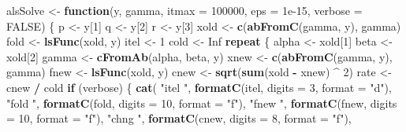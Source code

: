 \documentclass[
  12pt,
]{article}
\newenvironment{Shaded}{\begin{snugshade}}{\end{snugshade}}
\newcommand{\AttributeTok}[1]{\textcolor[rgb]{0.13,0.29,0.53}{#1}}
\newcommand{\ConstantTok}[1]{\textcolor[rgb]{0.56,0.35,0.01}{#1}}
\newcommand{\ControlFlowTok}[1]{\textcolor[rgb]{0.13,0.29,0.53}{\textbf{#1}}}
\newcommand{\DecValTok}[1]{\textcolor[rgb]{0.00,0.00,0.81}{#1}}
\newcommand{\FloatTok}[1]{\textcolor[rgb]{0.00,0.00,0.81}{#1}}
\newcommand{\FunctionTok}[1]{\textcolor[rgb]{0.13,0.29,0.53}{\textbf{#1}}}
\newcommand{\NormalTok}[1]{#1}
\newcommand{\OtherTok}[1]{\textcolor[rgb]{0.56,0.35,0.01}{#1}}
\newcommand{\SpecialCharTok}[1]{\textcolor[rgb]{0.81,0.36,0.00}{\textbf{#1}}}
\newcommand{\StringTok}[1]{\textcolor[rgb]{0.31,0.60,0.02}{#1}}
\begin{document}
\begin{Shaded}
\begin{Highlighting}[]
\NormalTok{alsSolve }\OtherTok{\textless{}{-}} \ControlFlowTok{function}\NormalTok{(y,}
\NormalTok{                     gamma,}
                     \AttributeTok{itmax =} \DecValTok{100000}\NormalTok{,}
                     \AttributeTok{eps =} \FloatTok{1e{-}15}\NormalTok{,}
                     \AttributeTok{verbose =} \ConstantTok{FALSE}\NormalTok{) \{}
\NormalTok{  p }\OtherTok{\textless{}{-}}\NormalTok{ y[}\DecValTok{1}\NormalTok{]}
\NormalTok{  q }\OtherTok{\textless{}{-}}\NormalTok{ y[}\DecValTok{2}\NormalTok{]}
\NormalTok{  r }\OtherTok{\textless{}{-}}\NormalTok{ y[}\DecValTok{3}\NormalTok{]}
\NormalTok{  xold }\OtherTok{\textless{}{-}} \FunctionTok{c}\NormalTok{(}\FunctionTok{abFromC}\NormalTok{(gamma, y), gamma)}
\NormalTok{  fold }\OtherTok{\textless{}{-}} \FunctionTok{lsFunc}\NormalTok{(xold, y)}
\NormalTok{  itel }\OtherTok{\textless{}{-}} \DecValTok{1}
\NormalTok{  cold }\OtherTok{\textless{}{-}} \ConstantTok{Inf}
  \ControlFlowTok{repeat}\NormalTok{ \{}
\NormalTok{    alpha }\OtherTok{\textless{}{-}}\NormalTok{ xold[}\DecValTok{1}\NormalTok{]}
\NormalTok{    beta }\OtherTok{\textless{}{-}}\NormalTok{ xold[}\DecValTok{2}\NormalTok{]}
\NormalTok{    gamma }\OtherTok{\textless{}{-}} \FunctionTok{cFromAb}\NormalTok{(alpha, beta, y)}
\NormalTok{    xnew }\OtherTok{\textless{}{-}} \FunctionTok{c}\NormalTok{(}\FunctionTok{abFromC}\NormalTok{(gamma, y), gamma)}
\NormalTok{    fnew }\OtherTok{\textless{}{-}} \FunctionTok{lsFunc}\NormalTok{(xold, y)}
\NormalTok{    cnew }\OtherTok{\textless{}{-}} \FunctionTok{sqrt}\NormalTok{(}\FunctionTok{sum}\NormalTok{(xold }\SpecialCharTok{{-}}\NormalTok{ xnew) }\SpecialCharTok{\^{}} \DecValTok{2}\NormalTok{)}
\NormalTok{    rate }\OtherTok{\textless{}{-}}\NormalTok{ cnew }\SpecialCharTok{/}\NormalTok{ cold}
    \ControlFlowTok{if}\NormalTok{ (verbose) \{}
      \FunctionTok{cat}\NormalTok{(}
        \StringTok{"itel "}\NormalTok{,}
        \FunctionTok{formatC}\NormalTok{(itel, }\AttributeTok{digits =} \DecValTok{3}\NormalTok{, }\AttributeTok{format =} \StringTok{"d"}\NormalTok{),}
        \StringTok{"fold "}\NormalTok{,}
        \FunctionTok{formatC}\NormalTok{(fold, }\AttributeTok{digits =} \DecValTok{10}\NormalTok{, }\AttributeTok{format =} \StringTok{"f"}\NormalTok{),}
        \StringTok{"fnew "}\NormalTok{,}
        \FunctionTok{formatC}\NormalTok{(fnew, }\AttributeTok{digits =} \DecValTok{10}\NormalTok{, }\AttributeTok{format =} \StringTok{"f"}\NormalTok{),}
        \StringTok{"chng "}\NormalTok{,}
        \FunctionTok{formatC}\NormalTok{(cnew, }\AttributeTok{digits =} \DecValTok{8}\NormalTok{, }\AttributeTok{format =} \StringTok{"f"}\NormalTok{),}

\end{Highlighting}
\end{Shaded}
\end{document}
